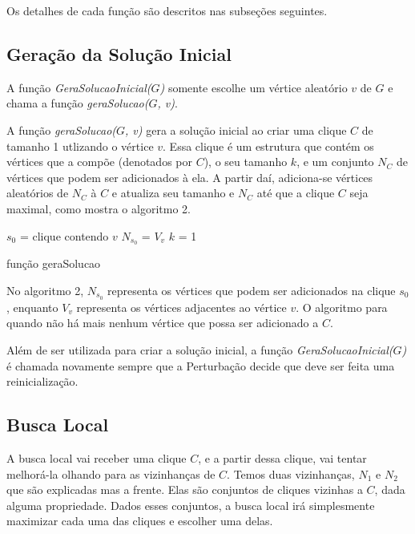\documentclass{article}
\begin{document}
Os detalhes de cada função são descritos nas subseções seguintes. 

\subsection{Geração da Solução Inicial}

A função \textit{GeraSolucaoInicial($G$)} somente escolhe um vértice aleatório $v$ de $G$ e chama a função \textit{geraSolucao($G$, v)}.\par

A função \textit{geraSolucao($G$, v)} gera a solução inicial ao criar uma clique $C$ de tamanho 1 utlizando o vértice $v$. Essa clique é um estrutura que contém os vértices que a compõe (denotados por $C$), o seu tamanho $k$, e um conjunto $N_C$ de vértices que podem ser adicionados à ela. A partir daí, adiciona-se vértices aleatórios de $N_C$ à $C$ e atualiza seu tamanho e $N_C$ até que a clique $C$ seja maximal, como mostra o algoritmo 2.\par

\begin{algorithm}
 $s_0$ = clique contendo $v$\;
 $N_{s_0}$ = $V_v$\;
 $k$ = 1\;
 \caption{função geraSolucao}
\end{algorithm}

No algoritmo 2, $N_{s_0}$ representa os vértices que podem ser adicionados na clique $s_0$, enquanto $V_v$ representa os vértices adjacentes ao vértice $v$. O algoritmo para quando não há mais nenhum vértice que possa ser adicionado a $C$.\par

Além de ser utilizada para criar a solução inicial, a função \textit{GeraSolucaoInicial($G$)} é chamada novamente sempre que a Perturbação decide que deve ser feita uma reinicialização.

\subsection{Busca Local}

A busca local vai receber uma clique $C$, e a partir dessa clique, vai tentar melhorá-la olhando para as vizinhanças de $C$. Temos duas vizinhanças, $N_1$ e $N_2$ que são explicadas mas a frente. Elas são conjuntos de cliques vizinhas a $C$, dada alguma propriedade. Dados esses conjuntos, a busca local irá simplesmente maximizar cada uma das cliques e escolher uma delas.\par
\end{document}
